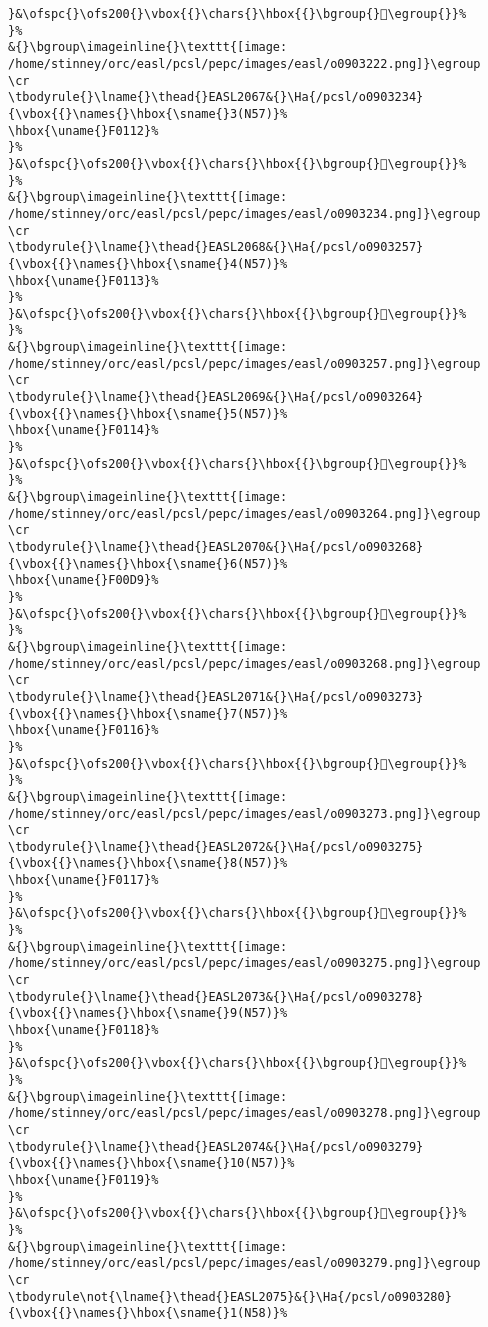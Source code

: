 \begin{verbatim}
}&\ofspc{}\ofs200{}\vbox{{}\chars{}\hbox{{}\bgroup{}󰄑\egroup{}}%
}%
&{}\bgroup\imageinline{}\texttt{[image: /home/stinney/orc/easl/pcsl/pepc/images/easl/o0903222.png]}\egroup
\cr
\tbodyrule{}\lname{}\thead{}EASL2067&{}\Ha{/pcsl/o0903234}{\vbox{{}\names{}\hbox{\sname{}3(N57)}%
\hbox{\uname{}F0112}%
}%
}&\ofspc{}\ofs200{}\vbox{{}\chars{}\hbox{{}\bgroup{}󰄒\egroup{}}%
}%
&{}\bgroup\imageinline{}\texttt{[image: /home/stinney/orc/easl/pcsl/pepc/images/easl/o0903234.png]}\egroup
\cr
\tbodyrule{}\lname{}\thead{}EASL2068&{}\Ha{/pcsl/o0903257}{\vbox{{}\names{}\hbox{\sname{}4(N57)}%
\hbox{\uname{}F0113}%
}%
}&\ofspc{}\ofs200{}\vbox{{}\chars{}\hbox{{}\bgroup{}󰄓\egroup{}}%
}%
&{}\bgroup\imageinline{}\texttt{[image: /home/stinney/orc/easl/pcsl/pepc/images/easl/o0903257.png]}\egroup
\cr
\tbodyrule{}\lname{}\thead{}EASL2069&{}\Ha{/pcsl/o0903264}{\vbox{{}\names{}\hbox{\sname{}5(N57)}%
\hbox{\uname{}F0114}%
}%
}&\ofspc{}\ofs200{}\vbox{{}\chars{}\hbox{{}\bgroup{}󰄔\egroup{}}%
}%
&{}\bgroup\imageinline{}\texttt{[image: /home/stinney/orc/easl/pcsl/pepc/images/easl/o0903264.png]}\egroup
\cr
\tbodyrule{}\lname{}\thead{}EASL2070&{}\Ha{/pcsl/o0903268}{\vbox{{}\names{}\hbox{\sname{}6(N57)}%
\hbox{\uname{}F00D9}%
}%
}&\ofspc{}\ofs200{}\vbox{{}\chars{}\hbox{{}\bgroup{}󰃙\egroup{}}%
}%
&{}\bgroup\imageinline{}\texttt{[image: /home/stinney/orc/easl/pcsl/pepc/images/easl/o0903268.png]}\egroup
\cr
\tbodyrule{}\lname{}\thead{}EASL2071&{}\Ha{/pcsl/o0903273}{\vbox{{}\names{}\hbox{\sname{}7(N57)}%
\hbox{\uname{}F0116}%
}%
}&\ofspc{}\ofs200{}\vbox{{}\chars{}\hbox{{}\bgroup{}󰄖\egroup{}}%
}%
&{}\bgroup\imageinline{}\texttt{[image: /home/stinney/orc/easl/pcsl/pepc/images/easl/o0903273.png]}\egroup
\cr
\tbodyrule{}\lname{}\thead{}EASL2072&{}\Ha{/pcsl/o0903275}{\vbox{{}\names{}\hbox{\sname{}8(N57)}%
\hbox{\uname{}F0117}%
}%
}&\ofspc{}\ofs200{}\vbox{{}\chars{}\hbox{{}\bgroup{}󰄗\egroup{}}%
}%
&{}\bgroup\imageinline{}\texttt{[image: /home/stinney/orc/easl/pcsl/pepc/images/easl/o0903275.png]}\egroup
\cr
\tbodyrule{}\lname{}\thead{}EASL2073&{}\Ha{/pcsl/o0903278}{\vbox{{}\names{}\hbox{\sname{}9(N57)}%
\hbox{\uname{}F0118}%
}%
}&\ofspc{}\ofs200{}\vbox{{}\chars{}\hbox{{}\bgroup{}󰄘\egroup{}}%
}%
&{}\bgroup\imageinline{}\texttt{[image: /home/stinney/orc/easl/pcsl/pepc/images/easl/o0903278.png]}\egroup
\cr
\tbodyrule{}\lname{}\thead{}EASL2074&{}\Ha{/pcsl/o0903279}{\vbox{{}\names{}\hbox{\sname{}10(N57)}%
\hbox{\uname{}F0119}%
}%
}&\ofspc{}\ofs200{}\vbox{{}\chars{}\hbox{{}\bgroup{}󰄙\egroup{}}%
}%
&{}\bgroup\imageinline{}\texttt{[image: /home/stinney/orc/easl/pcsl/pepc/images/easl/o0903279.png]}\egroup
\cr
\tbodyrule\not{\lname{}\thead{}EASL2075}&{}\Ha{/pcsl/o0903280}{\vbox{{}\names{}\hbox{\sname{}1(N58)}%

\end{verbatim}
